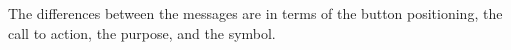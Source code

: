 The differences between the messages are in terms of the button positioning, the call to action, the purpose, and the symbol.



% 


